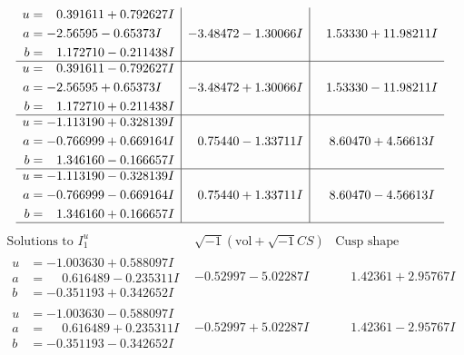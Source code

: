 \documentclass[1p]{elsarticle_modified}
\theoremstyle{definition}
\newcommand{\I}{\sqrt{-1}}
\begin{document}
$$\begin{array}{c|c|c}
\begin{aligned}
u &= \phantom{-}0.391611 + 0.792627 I \\
a &= -2.56595 - 0.65373 I \\
b &= \phantom{-}1.172710 - 0.211438 I\end{aligned}
 & -3.48472 - 1.30066 I & \phantom{-}1.53330 + 11.98211 I \\ \hline\begin{aligned}
u &= \phantom{-}0.391611 - 0.792627 I \\
a &= -2.56595 + 0.65373 I \\
b &= \phantom{-}1.172710 + 0.211438 I\end{aligned}
 & -3.48472 + 1.30066 I & \phantom{-}1.53330 - 11.98211 I \\ \hline\begin{aligned}
u &= -1.113190 + 0.328139 I \\
a &= -0.766999 + 0.669164 I \\
b &= \phantom{-}1.346160 - 0.166657 I\end{aligned}
 & \phantom{-}0.75440 - 1.33711 I & \phantom{-}8.60470 + 4.56613 I \\ \hline\begin{aligned}
u &= -1.113190 - 0.328139 I \\
a &= -0.766999 - 0.669164 I \\
b &= \phantom{-}1.346160 + 0.166657 I\end{aligned}
 & \phantom{-}0.75440 + 1.33711 I & \phantom{-}8.60470 - 4.56613 I\\
 \hline 
 \end{array}$$\newpage$$\begin{array}{c|c|c}  
\text{Solutions to }I^u_{1}& \I (\text{vol} + \sqrt{-1}CS) & \text{Cusp shape}\\
 \hline 
\begin{aligned}
u &= -1.003630 + 0.588097 I \\
a &= \phantom{-}0.616489 - 0.235311 I \\
b &= -0.351193 + 0.342652 I\end{aligned}
 & -0.52997 - 5.02287 I & \phantom{-}1.42361 + 2.95767 I \\ \hline\begin{aligned}
u &= -1.003630 - 0.588097 I \\
a &= \phantom{-}0.616489 + 0.235311 I \\
b &= -0.351193 - 0.342652 I\end{aligned}
 & -0.52997 + 5.02287 I & \phantom{-}1.42361 - 2.95767 I \\ \hline\begin{aligned}

\end{aligned}
\end{array}$$
\end{document}
